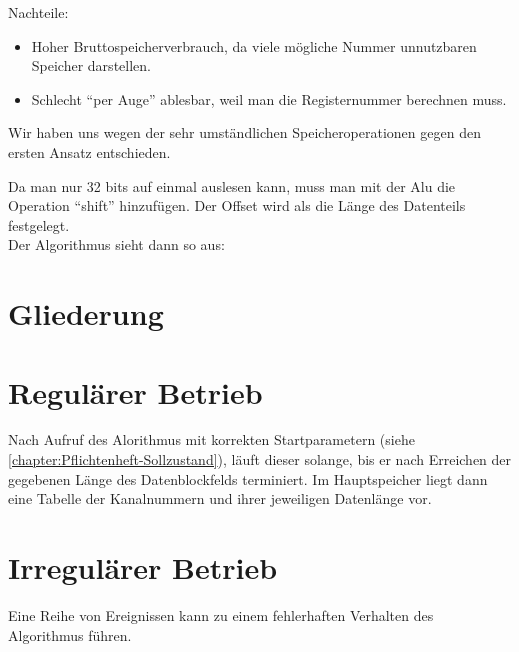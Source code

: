 Nachteile:
\begin{itemize}
    \item Hoher Bruttospeicherverbrauch, da viele mögliche Nummer unnutzbaren Speicher darstellen.
    \item Schlecht "`per Auge"' ablesbar, weil man die Registernummer berechnen muss.
\end{itemize}

Wir haben uns wegen der sehr umständlichen Speicheroperationen gegen den ersten Ansatz entschieden.

Da man nur 32 bits auf einmal auslesen kann, muss man mit der Alu die Operation "`shift"' hinzufügen. Der Offset wird als die Länge des Datenteils festgelegt.\\
Der Algorithmus sieht dann so aus:



\section{Gliederung}
\label{section:Pflichtenheft-SystemtechnischeLoesung-Gliederung}



\section{Regulärer Betrieb}
\label{section:Pflichtenheft-SystemtechnischeLoesung-regulaer}

Nach Aufruf des Alorithmus mit korrekten Startparametern (siehe \autoref{chapter:Pflichtenheft-Sollzustand}), läuft dieser solange, bis er nach Erreichen der gegebenen Länge des Datenblockfelds terminiert. Im Hauptspeicher liegt dann eine Tabelle der Kanalnummern und ihrer jeweiligen Datenlänge vor.


\section{Irregulärer Betrieb}
\label{section:Pflichtenheft-SystemtechnischeLoesung-irregulaer}

Eine Reihe von Ereignissen kann zu einem fehlerhaften Verhalten des Algorithmus führen.

